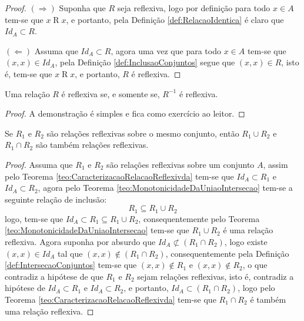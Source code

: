 \begin{proof}
	$(\Rightarrow)$ Suponha que $R$ seja reflexiva, logo por definição para todo $x \in A$ tem-se que $x \mathrel{R} x$, e portanto, pela Definição \ref{def:RelacaoIdentica} é claro que $Id_A \subset R$.
	
	$(\Leftarrow)$ Assuma que $Id_A \subset R$, agora uma vez que para todo $x \in A$ tem-se que $(x, x) \in Id_A$, pela Definição \ref{def:InclusaoConjuntos} segue que $(x, x) \in R$, isto é, tem-se que $x \mathrel{R} x$, e portanto, $R$ é reflexiva.
\end{proof}

\begin{corolario}\label{col:CaracterizacaoRelacaoReflexivda}
	Uma relação $R$ é reflexiva se, e somente se, $R^{-1}$ é reflexiva.
\end{corolario}

\begin{proof}
	A demonstração é simples e fica como exercício ao leitor.
\end{proof}

\begin{teorema}\label{teo:FechoAlgebricoRelacoesReflexivas}
	Se $R_1$ e $R_2$ são relações reflexivas sobre o mesmo conjunto, então $R_1 \cup R_2$ e $R_1 \cap R_2$ são também relações reflexivas.
\end{teorema}

\begin{proof}
	Assuma que $R_1$ e $R_2$ são relações reflexivas sobre um conjunto $A$, assim pelo Teorema \ref{teo:CaracterizacaoRelacaoReflexivda} tem-se que $Id_A \subset R_1$ e $Id_A \subset R_2$, agora pelo Teorema \ref{teo:MonotonicidadeDaUniaoIntersecao} tem-se a seguinte relação de inclusão:
	$$R_1 \subseteq R_1 \cup R_2$$
	logo, tem-se que $Id_A \subset R_1 \subseteq R_1 \cup R_2$, consequentemente pelo Teorema \ref{teo:MonotonicidadeDaUniaoIntersecao} tem-se que $R_1 \cup R_2$ é uma relação reflexiva. Agora suponha por absurdo que $Id_A \not\subset (R_1 \cap R_2)$, logo existe $(x, x) \in Id_A$ tal que $(x, x) \notin (R_1 \cap R_2)$, consequentemente pela Definição \ref{def:IntersecaoConjuntos} tem-se que $(x, x) \notin R_1$ e $(x, x) \notin R_2$, o que contradiz a hipótese de que $R_1$ e $R_2$ sejam relações reflexivas, isto é, contradiz a hipótese de $Id_A \subset R_1$ e $Id_A \subset R_2$, e portanto, $Id_A \subset (R_1 \cap R_2)$, logo pelo Teorema \ref{teo:CaracterizacaoRelacaoReflexivda} tem-se que $R_1 \cap R_2$ é também uma relação reflexiva.
\end{proof}

